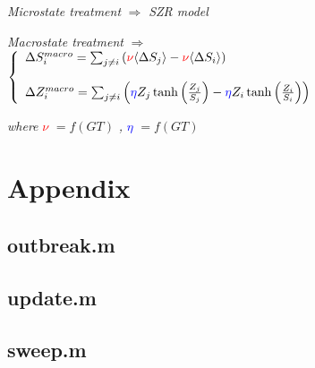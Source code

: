\documentclass[11pt]{article} %
\begin{document}
\bigskip

\textit{Microstate treatment} $\Rightarrow$ \textit{SZR model} 

\bigskip

\textit{Macrostate treatment} $\Rightarrow$  $\left\{
	\begin{array}{l l}
		\Delta S_{i}^{macro} =  \sum_{j\neq i}{ \left( \textcolor{red}{\nu} \langle \Delta S_{j} \rangle - \textcolor{red}{\nu}  \langle \Delta S_{i} \rangle \right) }	
    \\
    \\
    		\Delta Z_{i}^{macro} = \sum_{j\neq i}{\left( \textcolor{blue}{\eta} Z_{j}\tanh \left( \frac{Z_{j}}{S_{j}}\right) -\textcolor{blue}{\eta} Z_{i}\tanh \left( \frac{Z_{i}}{S_{i}}\right) \right)}

	\end{array} \right.$

\bigskip

\textit{where} \textcolor{red}{$\nu$} $= f(GT)$ \textit{,} \textcolor{blue}{$\eta$} $= f(GT)$  





\newpage

\nocite{bennett1995modelling, balcan2011phase, funk2010modelling, reluga2010game, reluga2009sis, munz2009zombies, drezner}



\newpage

\section{Appendix}
\bigskip
\subsection{outbreak.m}
\label{sec:outbreak}

\bigskip
\bigskip
\bigskip

\subsection{update.m}
\label{sec:update}

\bigskip
\bigskip
\bigskip

\subsection{sweep.m}
\label{sec:sweep}

\bigskip
\bigskip
\bigskip
\end{document}
